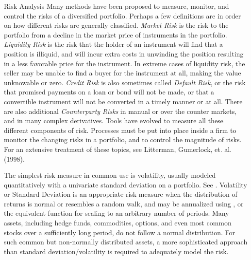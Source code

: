 \documentclass[12pt,letterpaper,english]{article}
\begin{document}
\begin{Section}{Risk Analysis}
Many methods have been proposed to measure, monitor, and control the risks of a diversified portfolio. Perhaps a few definitions are in order on how different risks are generally classified. \emph{Market Risk} is the risk to the portfolio from a decline in the market price of instruments in the portfolio.  \emph{Liquidity Risk} is the risk that the holder of an instrument will find that a position is illiquid, and will incur extra costs in unwinding the position resulting in a less favorable price for the instrument. In  extreme cases of liquidity risk, the seller may be unable to find a buyer for the instrument at all, making the value unknowable or zero.  \emph{Credit Risk} is also sometimes called \emph{Default Risk}, or the risk that promised payments on a loan or bond will not be made, or that a convertible instrument will not be converted in a timely manner or at all.  There are also additional \emph{Counterparty Risks} in manual or over the counter markets, and in many complex derivatives.  Tools have evolved to measure all these different components of risk.  Processes must be put into place inside a firm to monitor the changing risks in a portfolio, and to control the magnitude of risks.  For an extensive treatment of these topics, see Litterman, Gumerlock, et. al.(1998).

The simplest risk measure in common use is volatility, usually modeled quantitatively with a univariate standard deviation on a portfolio.  See  .  Volatility or Standard Deviation is an appropriate risk measure when the distribution of returns is normal or resembles a random walk, and may be annualized using , or the equivalent function  for scaling to an arbitrary number of periods.  Many assets, including hedge funds, commodities, options, and even most common stocks over a sufficiently long period, do not follow a normal distribution.  For such common but non-normally distributed assets, a more sophisticated approach than standard deviation/volatility is required to adequately model the risk.


\end{Section}
\end{document}
